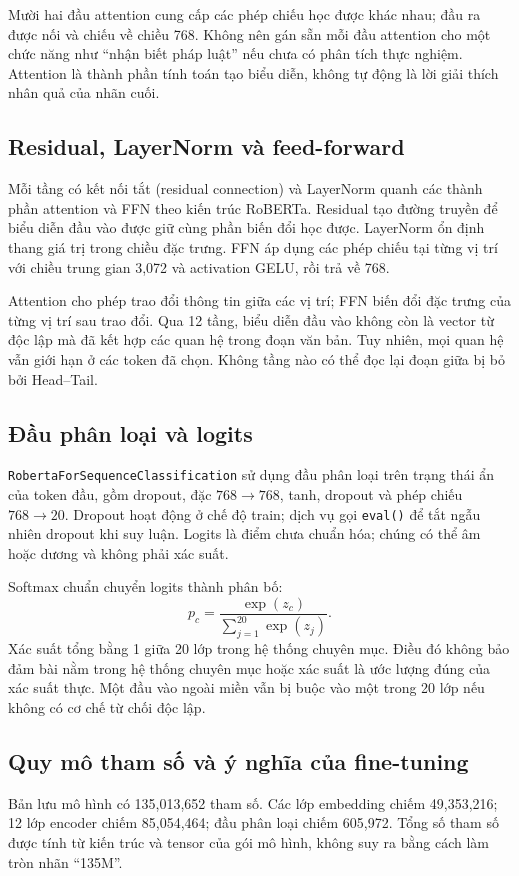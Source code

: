 \AttentionDiagram
Mười hai đầu attention cung cấp các phép chiếu học được khác nhau; đầu ra được nối và chiếu về chiều 768. Không nên gán sẵn mỗi đầu attention cho một chức năng như ``nhận biết pháp luật'' nếu chưa có phân tích thực nghiệm. Attention là thành phần tính toán tạo biểu diễn, không tự động là lời giải thích nhân quả của nhãn cuối.

\subsection{Residual, LayerNorm và feed-forward}
Mỗi tầng có kết nối tắt (residual connection) và LayerNorm quanh các thành phần attention và FFN theo kiến trúc RoBERTa. Residual tạo đường truyền để biểu diễn đầu vào được giữ cùng phần biến đổi học được. LayerNorm ổn định thang giá trị trong chiều đặc trưng. FFN áp dụng các phép chiếu tại từng vị trí với chiều trung gian 3,072 và activation GELU, rồi trả về 768.

Attention cho phép trao đổi thông tin giữa các vị trí; FFN biến đổi đặc trưng của từng vị trí sau trao đổi. Qua 12 tầng, biểu diễn đầu vào không còn là vector từ độc lập mà đã kết hợp các quan hệ trong đoạn văn bản. Tuy nhiên, mọi quan hệ vẫn giới hạn ở các token đã chọn. Không tầng nào có thể đọc lại đoạn giữa bị bỏ bởi Head--Tail.

\subsection{Đầu phân loại và logits}
\texttt{RobertaForSequenceClassification} sử dụng đầu phân loại trên trạng thái ẩn của token đầu, gồm dropout, đặc $768\to768$, tanh, dropout và phép chiếu $768\to20$. Dropout hoạt động ở chế độ train; dịch vụ gọi \texttt{eval()} để tắt ngẫu nhiên dropout khi suy luận. Logits là điểm chưa chuẩn hóa; chúng có thể âm hoặc dương và không phải xác suất.

Softmax chuẩn chuyển logits thành phân bố:
\begin{equation}
p_c=\frac{\exp(z_c)}{\sum_{j=1}^{20}\exp(z_j)}.
\end{equation}
Xác suất tổng bằng 1 giữa 20 lớp trong hệ thống chuyên mục. Điều đó không bảo đảm bài nằm trong hệ thống chuyên mục hoặc xác suất là ước lượng đúng của xác suất thực. Một đầu vào ngoài miền vẫn bị buộc vào một trong 20 lớp nếu không có cơ chế từ chối độc lập.

\subsection{Quy mô tham số và ý nghĩa của fine-tuning}
Bản lưu mô hình có 135,013,652 tham số. Các lớp embedding chiếm 49,353,216; 12 lớp encoder chiếm 85,054,464; đầu phân loại chiếm 605,972. Tổng số tham số được tính từ kiến trúc và tensor của gói mô hình, không suy ra bằng cách làm tròn nhãn ``135M''.


